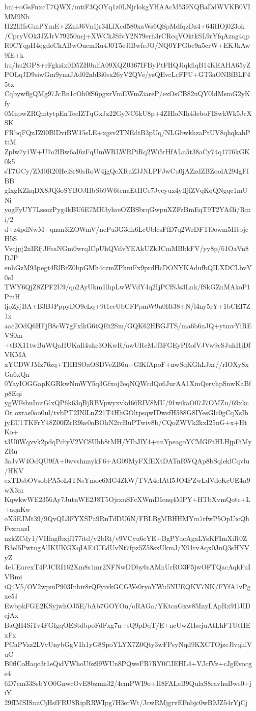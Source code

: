 hni+oGsFnxcT7QWX/mtiF3QOYq1z0LNjrlokgYHAAcM539NQBaDdWVKB0VIMM9Nb
H22IfffsGmPYmE+2ZniJ6Vn1jr34LlXcd580xaWs6QSpMdfqzDz4+64iHOj023ok
/CpryVOk3JZJrV79250ncj+XWCkJSfvY2N79erh3rCRcqVOktkSL9rYfqAzng4qp
R0CYqpH4qgdeChABwOucmRu4J0T5eJlBwfeJO/NQ0YPGbe9n5crW+EKJkAw9fE+k
hu/hu2GP8+rFgkzix0D5ZH0nlfA09XQZ0367IFByPtFHQJiqkfiqB14KEAHA65yZ
POLqJD9siwGm9ynaJAd02nbBi0sx26yV2QVe/ysQEvcLcFPU+GT3aONBfBLF45tx
CqbywflgQMg97JcBn1cOh0fS6pgxrVmEWmZiareP/exOsCB82uQY0ldMsmG2yKfy
0MnpwZRQmtytpEnTeeIZTqGxJz22GyNC6kU8p+4ZHloNIh43eboFISwkWk5JcXSK
FRbqFQzJZ90BlDviBW15sLE+xgsv2TNEdtB3pUq/NLGbwkhzaPtUV8qhqkahPttM
Zplw7y1W+U7o2lBw6aI6zFqUmWRLWRPiRq2Wi5rHfALn5t38aCy74q4776kGK0k5
sT7GCy/ZM0R20HelSr80sRoW4jgQcXRuZ3JNLPFJwCu0jAZzdZBZoolA294gFIBB
gIxgKZkqDX8JQ3oSYBOJHbSb9W6tenaEtHCe7Jvcyux4ylIjfZVqKqQNgqe1mUNi
yogFyUY7LssozPyg4kBU6E7MH3yhreOZBSbrqGwpuXZFzBmEqT9T2YAf3i/Rmi/2
d+z4pdNwM+qnan3iZOWmV/ncPu3G3dh6LeUblcsFfD7q2WrDFTl0owm5HtbjcH5S
Vvcjpj2z3RfjJFeaNGm0wrqICpUhQVdvYEAkUZkJCmMBbkFV/yy8p/61OaVn8DJP
enhGzM93pegt4RlBrZ0bpGMh4czmZPhniFx9prdHcDONYKAdufbQILXDCLbvY0eI
TWY6QjZ8ZPF2U9/qo2AyUkm1lhpLwWVdY4q2IjPCfSJs3Lnk/fSkGZnMAkoP1PmH
ljoZyjBA+B3BJPppyDO9cLq+9t1eeUbCFPpmW9u0Rt38+N/l4ny5rY+1bCEI7Z1x
aac2OdQ6HFjB8cW7gFxlkG6tQEt2Sm/GQK62HBGJTS/ma6b6nJQ+ytmvYiREVS0m
+tBX11twBuWQaHUKaIl4ukc3OKwR/awURcMJf3FGEyPRofVJVw9cSJuhHjDfVKMA
xYCDWJMz76zq+THHSOaOSDVeZB6u+GlKfApoF+nwSqKGhLJxr//rIOXy8xGa6xQn
0YayIOGGapKGRkwNmWY5q3Gfxoj2eqNQWcdQo6JurAA1XmQervhpSnwKaBfp8Eqi
ygWFsbnImtGlxQP6k63qBjRBVpwyxvkd66RIV8MU/91wikaO07J7OMZu/69xkcOr
oxras0oo0ul/tvbPT2INlLnZ21T4HhGOltpsqwIDwsfH588G8IYesGlc0gCqXsIb
jyEU1TKFrY48Z00fZrR9ke0oBOhN2rcBuPTwiv8b/CQoZWVk2kxI25nG+x+HtKo+
t3U0Wqvvk2pdqPdiyV2VC8Uhb8tMH/YIbJlY4+nnYpeagoYCMGFtHLHjpFiMyZRu
3aJvW4OdQU9fA+0wvshnnykF6+AG09MyFXfEXtDATnRWQAp8bSqleklCqvlu/HKV
exTDsbOVsobPA5oL4TNsYmoe6MG4ZkW/TVA4eIAtI5JO4PZwLdVdeKcUE4n9wX3m
KqwkwWE2356Ay7JutuWE2J8T5OjrxuSFcXWmDIenq4MPY+HTbXvmQotc+L+aqaKw
oX5EJMt39/9QvQL3FYXSPa9RuTdDU6N/FBLBgMBHHMYm7rfwP5OpUicQbFvzmazI
nzkZCdy1/VHfagfbxjf177itd/y2bRt/v9VCyu6cYE+BgPYucAgaLYsKFImXiR0Z
B3el5PwtugAlIKUKGXqIAE4UEdUvNt7fpz5Z58sxUkmJ/X91rvAqx0JnQ3sHNVyZ
4eUEurexT4PJCRI162Xm8s1mr2NFNwDDby6sAMnUrRO3F5jwOFTQacAqkFuIVBmi
iQ4V5/OV2wpmP903Inbir8rQFyivkGCGWs0ryoYWu5NUEQKV7NK/FYfA1vPgxe5J
EwbpkFGE2KSyjwhOJ5E/bAb7GOYOn/oRAGa/YKtcnGxw85InyLApRx91lJIDejAx
BaQH4SiTv4FGIgqOEStdbpoFdFxg7n+sQ9pDqT/E+ncUwZHsejuAtLhFTUtHExFx
PCaPVzz2LVvUnybGgV1h1yG8SpoYLYX7Z0Qty3wFPsyNqd9KXCTOjzcJlvqhlVuC
B0flCoHaqc3t1eQidVWhoU6z99WUn8PQweFB7RY0CJEHL4+VJcfVz+cJgEvocge4
6D7em33SsbYO0GnwcOvE8bzmn32/4cmPWI9o+H8FALeB9QulaS8ravhuBwe0+jiY
29fIMSISnnCjHsfFRU8RipRRWIpg7H3erWt/JcwRMjgrvEFnbjc0wB9JZ54rYjCj
